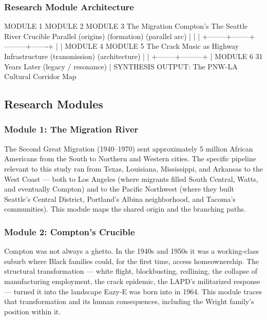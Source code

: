 \documentclass[11pt,letterpaper]{article}
\begin{document}
\subsubsection{Research Module Architecture}

\begin{asciibox}
MODULE 1          MODULE 2          MODULE 3
The Migration     Compton's         The Seattle
River             Crucible          Parallel
(origins)         (formation)       (parallel arc)
    |                 |                 |
    +--------+--------+---------+-------+
             |                  |
         MODULE 4           MODULE 5
         The Crack           Music as
         Highway             Infrastructure
         (transmission)      (architecture)
             |                  |
             +--------+---------+
                      |
                  MODULE 6
                  31 Years Later
                  (legacy / resonance)
                      |
                 SYNTHESIS OUTPUT:
            The PNW-LA Cultural Corridor Map
\end{asciibox}

\subsection{Research Modules}

\subsubsection{Module 1: The Migration River}

The Second Great Migration (1940--1970) sent approximately 5 million African Americans from the South to Northern and Western cities. The specific pipeline relevant to this study ran from Texas, Louisiana, Mississippi, and Arkansas to the West Coast --- both to Los Angeles (where migrants filled South Central, Watts, and eventually Compton) and to the Pacific Northwest (where they built Seattle's Central District, Portland's Albina neighborhood, and Tacoma's communities). This module maps the shared origin and the branching paths.

\subsubsection{Module 2: Compton's Crucible}

Compton was not always a ghetto. In the 1940s and 1950s it was a working-class suburb where Black families could, for the first time, access homeownership. The structural transformation --- white flight, blockbusting, redlining, the collapse of manufacturing employment, the crack epidemic, the LAPD's militarized response --- turned it into the landscape Eazy-E was born into in 1964. This module traces that transformation and its human consequences, including the Wright family's position within it.
\end{document}
